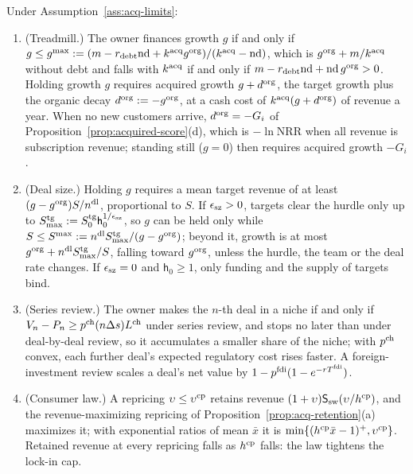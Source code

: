 \begin{proposition}\label{prop:acq-limits}
Under Assumption~\ref{ass:acq-limits}:
\begin{enumerate}
\item[(a)] (Treadmill.) The owner finances growth $g$ if and only if $g\le g^{\max}:=(m-r_{\rm debt}\mathrm{nd}+k^{\rm acq}g^{\rm org})/(k^{\rm acq}-\mathrm{nd})$, which is $g^{\rm org}+m/k^{\rm acq}$ without debt and falls with $k^{\rm acq}$ if and only if $m-r_{\rm debt}\mathrm{nd}+\mathrm{nd}\,g^{\rm org}>0$. Holding growth $g$ requires acquired growth $g+d^{\rm org}$, the target growth plus the organic decay $d^{\rm org}:=-g^{\rm org}$, at a cash cost of $k^{\rm acq}(g+d^{\rm org})$ of revenue a year. When no new customers arrive, $d^{\rm org}=-G_i$ of Proposition~\ref{prop:acquired-score}(d), which is $-\ln\mathrm{NRR}$ when all revenue is subscription revenue; standing still ($g=0$) then requires acquired growth $-G_i$.
\item[(b)] (Deal size.) Holding $g$ requires a mean target revenue of at least $(g-g^{\rm org})S/n^{\rm dl}$, proportional to $S$. If $\epsilon_{\rm sz}>0$, targets clear the hurdle only up to $S^{\rm tg}_{\max}:=S^{\rm tg}_0\mathsf h_0^{1/\epsilon_{\rm sz}}$, so $g$ can be held only while $S\le S^{\max}:=n^{\rm dl}S^{\rm tg}_{\max}/(g-g^{\rm org})$; beyond it, growth is at most $g^{\rm org}+n^{\rm dl}S^{\rm tg}_{\max}/S$, falling toward $g^{\rm org}$, unless the hurdle, the team or the deal rate changes. If $\epsilon_{\rm sz}=0$ and $\mathsf h_0\ge1$, only funding and the supply of targets bind.
\item[(c)] (Series review.) The owner makes the $n$-th deal in a niche if and only if $V_n-P_n\ge p^{\rm ch}(n\Delta s)L^{\rm ch}$ under series review, and stops no later than under deal-by-deal review, so it accumulates a smaller share of the niche; with $p^{\rm ch}$ convex, each further deal's expected regulatory cost rises faster. A foreign-investment review scales a deal's net value by $1-p^{\rm fdi}(1-e^{-rT^{\rm fdi}})$.
\item[(d)] (Consumer law.) A repricing $\upsilon\le\upsilon^{\rm cp}$ retains revenue $(1+\upsilon)\mathsf S_{\rm sw}(\upsilon/h^{\rm cp})$, and the revenue-maximizing repricing of Proposition~\ref{prop:acq-retention}(a) maximizes it; with exponential ratios of mean $\bar x$ it is $\min\{(h^{\rm cp}\bar x-1)^+,\upsilon^{\rm cp}\}$. Retained revenue at every repricing falls as $h^{\rm cp}$ falls: the law tightens the lock-in cap.
\end{enumerate}
\end{proposition}

